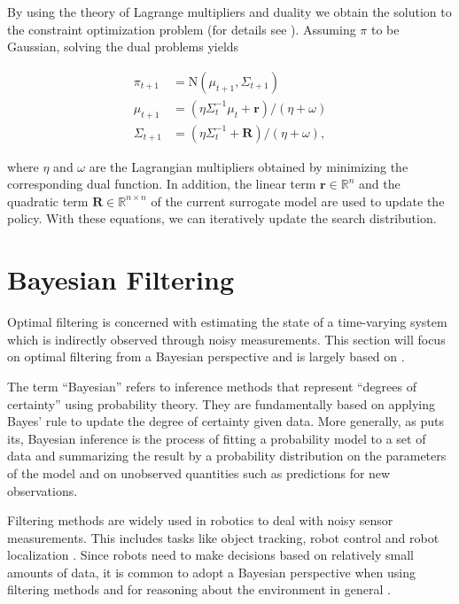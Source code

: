 By using the theory of Lagrange multipliers and duality \citep{boyd2004convex}
we obtain the solution to the constraint optimization problem 
(for details see ).
Assuming $\pi$ to be Gaussian, solving the dual problems yields

\begin{equation}
  \label{policy_update}
  \begin{aligned}
    \pi_{t+1} &= \text{N}(\mu_{t+1}, \Sigma_{t+1}) \\
    \mu_{t+1} &= (\eta \Sigma_{t}^{-1}\mu_t + \mathbf{r}) / (\eta + \omega) \\
    \Sigma_{t+1} &= (\eta \Sigma_t^{-1} + \mathbf{R}) / (\eta + \omega),
  \end{aligned}
\end{equation}

where $\eta$ and $\omega$ are the Lagrangian multipliers obtained
by minimizing
the corresponding dual function. In addition,
the linear term  $\mathbf{r} \in \mathbb{R}^n$ and
the quadratic term $\mathbf{R} \in \mathbb{R}^{n\times n}$  of
the current surrogate model are
used to update the policy.
With these equations, we can iteratively update the search distribution.


\section{Bayesian Filtering}
Optimal filtering is concerned with estimating the state
of a time-varying system
which is indirectly observed through noisy measurements.
This section will focus on optimal filtering from a Bayesian perspective
and is largely based on \citet{sarkka2013bayesian}.

The term ``Bayesian'' refers to inference methods that represent
``degrees of certainty'' using probability theory. They are fundamentally
based on applying
Bayes' rule to update the degree of certainty given data.
More generally, as \citet{gelman2013bayesian} puts its, Bayesian inference
is the process of fitting a probability model
to a set of data and summarizing the result by a probability distribution
on the parameters of the model and on unobserved quantities such
as predictions for new observations.

Filtering methods are widely used in robotics
to deal with noisy sensor measurements. This
includes tasks like object tracking, robot control and
robot localization \citep{chen2011kalman}.
Since robots need to make decisions based on relatively small amounts
of data, it is common to adopt a Bayesian perspective when
using filtering methods and for 
reasoning about the environment in general \citep{thrun2002probabilistic}.

